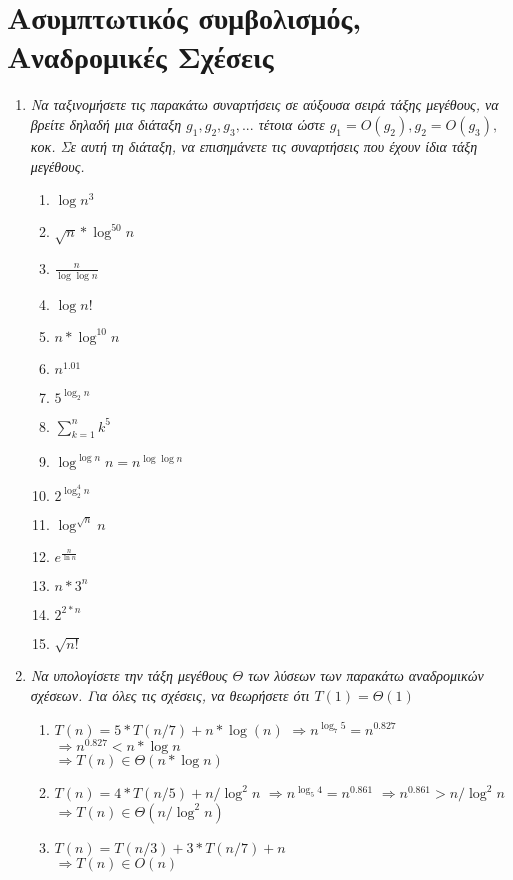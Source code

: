 \documentclass[a4paper,10pt]{article} \usepackage{anysize}
\begin{document}

\section{Ασυμπτωτικός συμβολισμός, Αναδρομικές
Σχέσεις} \setcounter{section}{1}
\begin{enumerate}
\item \textit{Να ταξινομήσετε τις παρακάτω συναρτήσεις σε αύξουσα σειρά τάξης
μεγέθους, να βρείτε δηλαδή μια διάταξη $g_1,g_2,g_3,...$ τέτοια ώστε $g_1 =
O(g_2),g_2=O(g_3),$ κοκ. Σε αυτή τη διάταξη, να επισημάνετε τις συναρτήσεις
που έχουν ίδια τάξη μεγέθους.}
\begin{enumerate}
\item $\log {n^3}$
\item $\sqrt{n}*\log^{50}{n} $
\item $\frac{n}{\log{\log{n}} } $
\item $\log{n!} $
\item $n*\log^{10}{n} $
\item $n^{1.01} $
\item $5^{\log_{2}{n}} $
\item $\sum_{k=1}^n{k^5} $
\item $\log^{\log{n}}{n} = n^{\log{\log{n}} } $
\item $2^{\log_2^4{n}} $
\item $\log^{\sqrt{n}}{n} $
\item $e^{\frac{n}{\ln{n}} } $
\item $n*3^n $
\item $2^{2*n} $
\item $\sqrt{n!} $
\end{enumerate}
\item \textit{Να υπολογίσετε την τάξη μεγέθους $\Theta$ των λύσεων των παρακάτω αναδρομικών
σχέσεων. Για όλες τις σχέσεις, να θεωρήσετε ότι $T(1)=\Theta(1)$}
\begin{enumerate}
\item $T(n)=5*T(n/7)+n*\log(n)$
$\Rightarrow n^{\log _7 {5}} = n^{0.827}$
$\Rightarrow n^{0.827} < n*\log{n}$\\
$\Rightarrow T(n) \in \Theta(n*\log{n})$

\item $T(n) = 4*T(n/5)+n/\log^2{n}$
$\Rightarrow n^{\log_5 {4}} = n^{0.861}$
$\Rightarrow n^{0.861} > n/\log^2{n}$\\
$\Rightarrow T(n) \in \Theta(n/\log^2{n})$

\item $T(n) = T(n/3) +3*T(n/7)+n$\\
$\Rightarrow T(n) \in O(n)$


\end{enumerate}
\end{enumerate}
\end{document}

